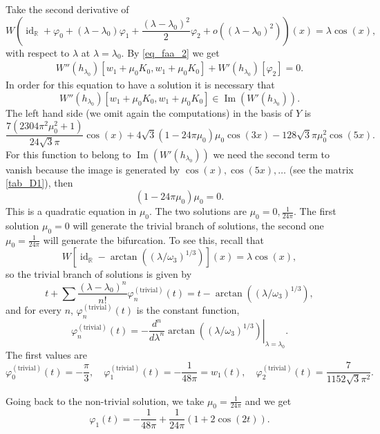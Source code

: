 \documentclass{amsart}
\def \R{\mathbb R}
\def \im{\operatorname{Im}}
\def \id{\operatorname{id}}
\begin{document}
Take the second derivative of
\[W\left(\id_\R + \varphi_0 + (\lambda-\lambda_0) \varphi_1 + \frac{(\lambda-\lambda_0)^2}2 \varphi_2 + o((\lambda-\lambda_0)^2) \right)(x) = \lambda \cos(x),\]
with respect to $\lambda$ at $\lambda = \lambda_0$.
By \eqref{eq_faa_2} we get
\begin{align}
	\label{eq_step2}
	W''(h_{\lambda_0})[w_1 + \mu_0 K_0, w_1 + \mu_0 K_0] + W'(h_{\lambda_0})[\varphi_2] = 0.
\end{align}
In order for this equation to have a solution it is necessary that 
\begin{equation}
	\label{eq_image_condition}
	W''(h_{\lambda_0})[w_1 + \mu_0 K_0, w_1 + \mu_0 K_0] \in \im(W'(h_{\lambda_0})).
\end{equation}
The left hand side (we omit again the computations) in the basis of $Y$ is
\[
	\frac{7 \left(2304 \pi ^2 \mu _0^2+1\right)}{24 \sqrt{3} \pi } \cos (x)
	+4 \sqrt{3} \left(1-24 \pi \mu _0\right) \mu _0 \cos (3 x)
	-128 \sqrt{3} \pi \mu _0^2 \cos (5 x).
\]
For this function to belong to $\im(W'(h_{\lambda_0}))$ we need the second term to vanish because the image is generated by $\cos(x), \cos(5x), \ldots$ (see the matrix \eqref{tab_D1}), then
\[(1-24 \pi \mu _0)\mu _0=0.\]
This is a quadratic equation in $\mu_0$. The two solutions are $\mu_0=0, \frac 1{24 \pi}$.
The first solution $\mu_0 = 0$ will generate the trivial branch of solutions, the second one $\mu_0 = \frac 1{24 \pi}$ will generate the bifurcation.
To see this, recall that
\[W[\id_\R - \arctan((\lambda/\omega_3)^{1/3}) ](x) = \lambda \cos(x),\]
so the trivial branch of solutions is given by
\[t + \sum \frac{(\lambda-\lambda_0)^n}{n!} \varphi_n^{(\text{trivial})}(t) = t - \arctan((\lambda/\omega_3)^{1/3}),\]
and for every $n$, $\varphi_n^{(\text{trivial})}(t)$ is the constant function,
\[\varphi_n^{(\text{trivial})}(t) = \left. - \frac{d^n}{d\lambda^n}\arctan((\lambda/\omega_3)^{1/3}) \right|_{\lambda=\lambda_0}.\]
The first values are
\[
	\varphi_0^{(\text{trivial})}(t) = -\frac{\pi}3,
	\quad \varphi_1^{(\text{trivial})}(t) = -\frac 1{48 \pi} = w_1(t),
	\quad \varphi_2^{(\text{trivial})}(t) =\frac {7}{1152 \sqrt 3 \pi^2}.
\]

Going back to the non-trivial solution, we take $\mu_0 = \frac 1{24 \pi}$ and we get
\begin{equation}
	\label{eq_varphi1}
	\varphi_1(t) = -\frac 1{48 \pi} + \frac 1{24 \pi} (1+2\cos(2t)).
\end{equation}
\end{document}
